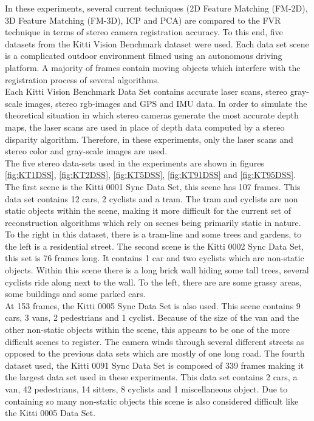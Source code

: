 	
In these experiments, several current techniques (2D Feature Matching (FM-2D), 3D Feature Matching (FM-3D), ICP and PCA) are compared to the FVR technique in terms of stereo camera registration accuracy. To this end, five datasets from the Kitti Vision Benchmark dataset \cite{Geiger13Vision} were used. Each data set scene is a complicated outdoor environment filmed using an autonomous driving platform. A majority of frames contain moving objects which interfere with the registration process of several algorithms. \\

Each Kitti Vision Benchmark Data Set contains accurate laser scans, stereo gray-scale images, stereo rgb-images and GPS and IMU data. In order to simulate the theoretical situation in which stereo cameras generate the most accurate depth maps, the laser scans are used in place of depth data computed by a stereo disparity algorithm. Therefore, in these experiments, only the laser scans and stereo color and gray-scale images are used. \\

The five stereo data-sets used in the experiments are shown in figures \ref{fig:KT1DSS}, \ref{fig:KT2DSS}, \ref{fig:KT5DSS}, \ref{fig:KT91DSS} and \ref{fig:KT95DSS}. The first scene is the Kitti 0001 Sync Data Set, this scene has 107 frames. This data set contains 12 cars, 2 cyclists and a tram. The tram and cyclists are non static objects within the scene, making it more difficult for the current set of reconstruction algorithms which rely on scenes being primarily static in nature. To the right in this dataset, there is a tram-line and some trees and gardens, to the left is a residential street. The second scene is the Kitti 0002 Sync Data Set, this set is 76 frames long. It contains 1 car and two cyclists which are non-static objects. Within this scene there is a long brick wall hiding some tall trees, several cyclists ride along next to the wall. To the left, there are are some grassy areas, some buildings and some parked cars. \\

At 153 frames, the Kitti 0005 Sync Data Set is also used. This scene contains 9 cars, 3 vans, 2 pedestrians and 1 cyclist. Because of the size of the van and the other non-static objects within the scene, this appears to be one of the more difficult scenes to register. The camera winds through several different streets as opposed to the previous data sets which are mostly of one long road. The fourth dataset used, the Kitti 0091 Sync Data Set is composed of 339 frames making it the largest data set used in these experiments. This data set contains 2 cars, a van, 42 pedestrians, 14 sitters, 8 cyclists and 1 miscellaneous object. Due to containing so many non-static objects this scene is also considered difficult like the Kitti 0005 Data Set. \\

